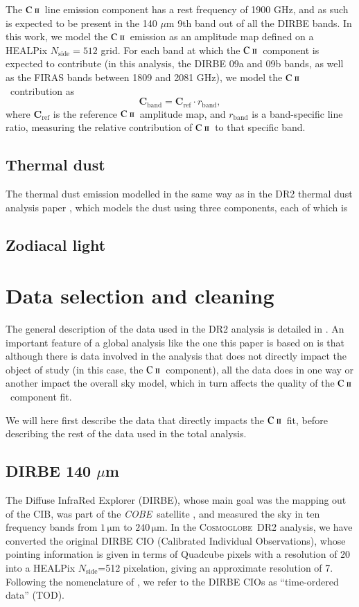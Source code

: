 \documentclass{aa}
\newcommand{\mathsc}[1]{{\normalfont\textsc{#1}}}
\def\Cosmoglobe{\textsc{Cosmoglobe}}
\def\COBE{\textit{COBE}}
\def\nside{$N_{\mathrm{side}}$}
\newcommand{\cii}{\ensuremath{\mathsc {C\ ii}}}
\begin{document}
The \cii\ line emission component has a rest frequency of 1900 GHz, and as such
is expected to be present in the 140 $\mu$m 9th band out of all the DIRBE bands. In
this work, we model the \cii\ emission as an amplitude map defined on a HEALPix
\citep{HEALPIX} \nside$=512$ grid. For each band at which the \cii\ component
is expected to contribute (in this analysis, the DIRBE 09a and 09b bands, as
well as the FIRAS bands between 1809 and 2081 GHz), we model the \cii\
contribution as
\begin{equation}
    \mathbf{C}_{\mathrm{band}} = \mathbf{C}_{\mathrm{ref}} \cdot
    r_{\mathrm{band}},
\end{equation}
where $\mathbf{C}_{\mathrm{ref}}$ is the reference \cii\ amplitude map, and
$r_{\mathrm{band}}$ is a band-specific line ratio, measuring the relative
contribution of \cii\ to that specific band.


\subsection{Thermal dust}
The thermal dust emission modelled in the same way as in the DR2 thermal dust
analysis paper \citep{CG02_05}, which models the dust using three components,
each of which is 
\subsection{Zodiacal light}

\clearpage
\section{Data selection and cleaning}
\label{sec:dataselection}

The general description of the data used in the DR2 analysis is detailed in
\citet{CG02_01}. An important feature of a global analysis like the one this
paper is based on is that although there is data involved in the analysis that
does not directly impact the object of study (in this case, the \cii\
component), all the data does in one way or another impact the overall sky
model, which in turn affects the quality of the \cii\ component fit.

We will here first describe the data that directly impacts the \cii\ fit,
before describing the rest of the data used in the total analysis.

\subsection{DIRBE 140 $\mu$m}
The Diffuse InfraRed Explorer (DIRBE), whose main goal was the mapping out of the
CIB, was part of the \COBE\ satellite \citep{boggess92, silverberg93}, and
measured the sky in ten frequency bands from $1\,\mathrm{\mu}$m to
$240\,\mathrm{\mu}$m. In the \Cosmoglobe\ DR2 analysis, we have converted the
original DIRBE CIO (Calibrated Individual Observations), whose pointing
information is given in terms of Quadcube pixels with a resolution of 20\arcs
into a HEALPix \nside=512 pixelation, giving an approximate resolution of
7\arcm. Following the nomenclature of \citet{CG02_01}, we refer to the DIRBE
CIOs as ``time-ordered data'' (TOD).
\end{document}
